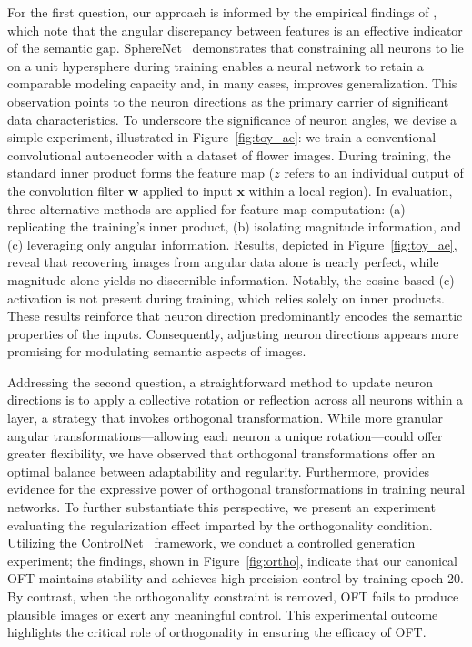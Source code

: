 For the first question, our approach is informed by the empirical findings of \cite{liu2018decoupled,chen2020angular}, which note that the angular discrepancy between features is an effective indicator of the semantic gap. SphereNet~\cite{liu2017deep} demonstrates that constraining all neurons to lie on a unit hypersphere during training enables a neural network to retain a comparable modeling capacity and, in many cases, improves generalization. This observation points to the neuron directions as the primary carrier of significant data characteristics. To underscore the significance of neuron angles, we devise a simple experiment, illustrated in Figure~\ref{fig:toy_ae}: we train a conventional convolutional autoencoder with a dataset of flower images. During training, the standard inner product forms the feature map ($z$ refers to an individual output of the convolution filter $\bm{w}$ applied to input $\bm{x}$ within a local region). In evaluation, three alternative methods are applied for feature map computation: (a) replicating the training’s inner product, (b) isolating magnitude information, and (c) leveraging only angular information. Results, depicted in Figure~\ref{fig:toy_ae}, reveal that recovering images from angular data alone is nearly perfect, while magnitude alone yields no discernible information. Notably, the cosine-based (c) activation is not present during training, which relies solely on inner products. These results reinforce that neuron direction predominantly encodes the semantic properties of the inputs. Consequently, adjusting neuron directions appears more promising for modulating semantic aspects of images.

Addressing the second question, a straightforward method to update neuron directions is to apply a collective rotation or reflection across all neurons within a layer, a strategy that invokes orthogonal transformation. While more granular angular transformations—allowing each neuron a unique rotation—could offer greater flexibility, we have observed that orthogonal transformations offer an optimal balance between adaptability and regularity. Furthermore, \cite{liu2021orthogonal} provides evidence for the expressive power of orthogonal transformations in training neural networks. To further substantiate this perspective, we present an experiment evaluating the regularization effect imparted by the orthogonality condition. Utilizing the ControlNet~\cite{zhang2023adding} framework, we conduct a controlled generation experiment; the findings, shown in Figure~\ref{fig:ortho}, indicate that our canonical OFT maintains stability and achieves high-precision control by training epoch 20. By contrast, when the orthogonality constraint is removed, OFT fails to produce plausible images or exert any meaningful control. This experimental outcome highlights the critical role of orthogonality in ensuring the efficacy of OFT.

